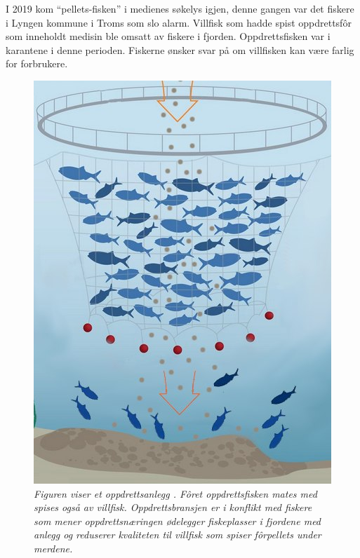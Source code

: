 I 2019 kom ``pellets-fisken'' i medienes søkelys igjen, denne gangen var det fiskere i Lyngen kommune i Troms som slo alarm. Villfisk som hadde spist oppdrettsfôr som inneholdt medisin ble omsatt av fiskere i fjorden. Oppdrettsfisken var i karantene i denne perioden. Fiskerne ønsker svar på om villfisken kan være farlig for forbrukere. \cite{Trana m.fl. 2019}

\begin{figure} 
\begin{center} 
\includegraphics[scale=0.7]{figures/merder-fisk}
\caption{\small \sl Figuren viser et oppdrettsanlegg \cite{Spruill 2011 s. 12}. Fôret oppdrettsfisken mates med spises også av villfisk. Oppdrettsbransjen er i konflikt med fiskere som mener oppdrettsnæringen ødelegger fiskeplasser i fjordene med anlegg og reduserer kvaliteten til villfisk som spiser fôrpellets under merdene. \cite{Olsen m.fl. 2018} \label{fig:anlegg}} 
\end{center} 
\end{figure} 


